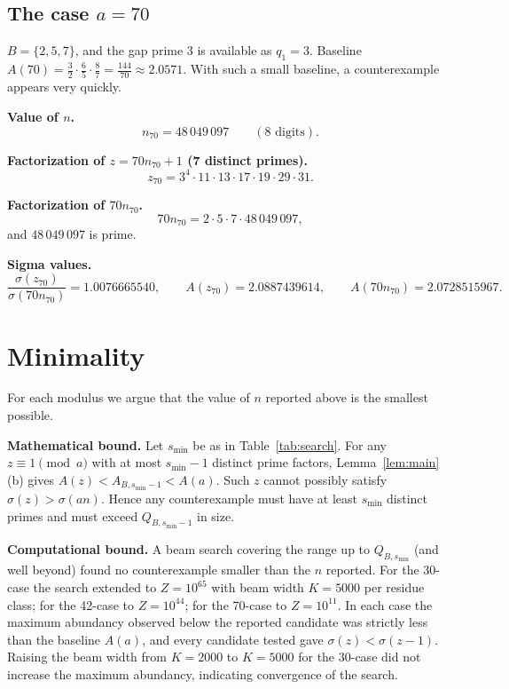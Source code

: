 \documentclass[12pt]{amsart}
\theoremstyle{definition}
\begin{document}
\subsection{The case $a = 70$}

$B = \{2,5,7\}$, and the gap prime $3$ is available as $q_1 = 3$.
Baseline $A(70) = \frac{3}{2}\cdot\frac{6}{5}\cdot\frac{8}{7}
= \frac{144}{70} \approx 2.0571$.
With such a small baseline, a counterexample appears very quickly.

\medskip
\noindent
\textbf{Value of $n$.}
\[
n_{70} = 48\,049\,097 \qquad (\text{8 digits}).
\]

\medskip
\noindent
\textbf{Factorization of $z = 70n_{70}+1$ (7 distinct primes).}
\[
z_{70} = 3^{4} \cdot 11 \cdot 13 \cdot 17 \cdot 19 \cdot 29 \cdot 31 .
\]

\medskip
\noindent
\textbf{Factorization of $70n_{70}$.}
\[
70n_{70} = 2 \cdot 5 \cdot 7 \cdot 48\,049\,097 ,
\]
and $48\,049\,097$ is prime.

\medskip
\noindent
\textbf{Sigma values.}
\[
\frac{\sigma(z_{70})}{\sigma(70n_{70})} = 1.0076665540,\qquad
A(z_{70}) = 2.0887439614,\qquad
A(70n_{70}) = 2.0728515967 .
\]

\section{Minimality}

For each modulus we argue that the value of $n$ reported above is the
smallest possible.

\medskip\noindent
\textbf{Mathematical bound.}
Let $s_{\min}$ be as in Table~\ref{tab:search}.  For any $z \equiv 1 \pmod{a}$
with at most $s_{\min}-1$ distinct prime factors, Lemma~\ref{lem:main}(b)
gives $A(z) < A_{B,s_{\min}-1} < A(a)$.  Such $z$ cannot possibly satisfy
$\sigma(z) > \sigma(an)$.  Hence any counterexample must have at least
$s_{\min}$ distinct primes and must exceed $Q_{B,s_{\min}-1}$ in size.

\medskip\noindent
\textbf{Computational bound.}
A beam search covering the range up to $Q_{B,s_{\min}}$ (and well beyond)
found no counterexample smaller than the $n$ reported.  For the 30-case the
search extended to $Z = 10^{65}$ with beam width $K = 5000$ per residue class;
for the 42-case to $Z = 10^{44}$; for the 70-case to $Z = 10^{11}$.  In each
case the maximum abundancy observed below the reported candidate was strictly
less than the baseline $A(a)$, and every candidate tested gave
$\sigma(z) < \sigma(z-1)$.  Raising the beam width from $K = 2000$ to
$K = 5000$ for the 30-case did not increase the maximum abundancy, indicating
convergence of the search.
\end{document}
